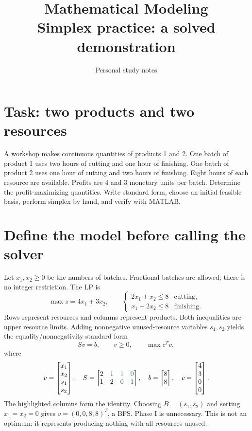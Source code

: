 \documentclass[11pt,a4paper]{article}
\title{\textbf{Mathematical Modeling}\\[2mm]\large Simplex practice: a solved demonstration}
\author{Personal study notes}
\date{}
\begin{document}
\maketitle

\section{Task: two products and two resources}
A workshop makes continuous quantities of products 1 and 2. One batch of
product 1 uses two hours of cutting and one hour of finishing. One batch of
product 2 uses one hour of cutting and two hours of finishing. Eight hours of
each resource are available. Profits are 4 and 3 monetary units per batch.
Determine the profit-maximizing quantities. Write standard form, choose an
initial feasible basis, perform simplex by hand, and verify with MATLAB.

\section{Define the model before calling the solver}
Let $x_1,x_2\geq0$ be the numbers of batches. Fractional batches are allowed;
there is no integer restriction. The LP is
\[
  \max z=4x_1+3x_2,\qquad
  \begin{cases}2x_1+x_2\leq8 & \text{cutting},   \\
             x_1+2x_2\leq8 & \text{finishing}.
  \end{cases}
\]
Rows represent resources and columns represent products. Both inequalities
are upper resource limits. Adding nonnegative unused-resource variables
$s_1,s_2$ yields the equality/nonnegativity standard form
\[
  S v=b,\qquad v\geq0,\qquad \max c^Tv,
\]
where
\[
  v=\begin{bmatrix}x_1\\x_2\\s_1\\s_2\end{bmatrix},\quad
  S=\begin{bmatrix}2&1&\color{modelblue}1&\color{modelblue}0\\
    1&2&\color{modelblue}0&\color{modelblue}1\end{bmatrix},\quad
  b=\begin{bmatrix}8\\8\end{bmatrix},\quad
  c=\begin{bmatrix}4\\3\\0\\0\end{bmatrix}.
\]
The highlighted columns form the identity. Choosing $B=(s_1,s_2)$ and
setting $x_1=x_2=0$ gives $v=(0,0,8,8)^T$, a BFS. Phase I is unnecessary.
This is not an optimum: it represents producing nothing with all resources unused.
\end{document}
